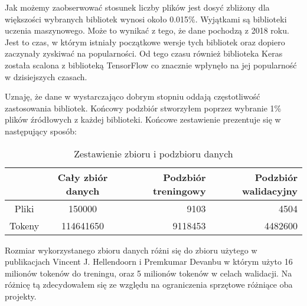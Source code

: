 Jak możemy zaobserwować stosunek liczby plików jest dosyć zbliżony dla większości wybranych bibliotek wynosi około 0.015\%. Wyjątkami są 
biblioteki uczenia maszynowego. Może to wynikać z tego, że dane pochodzą z 2018 roku. Jest to czas, w którym istniały początkowe wersje tych bibliotek oraz dopiero
zaczynały zyskiwać na popularności. Od tego czasu również biblioteka Keras została scalona z biblioteką TensorFlow co znacznie wpłynęło na jej popularność w dzisiejszych czasach. 

Uznaję, że dane w wystarczająco dobrym stopniu oddają częstotliwość zastosowania bibliotek. Końcowy podzbiór stworzyłem poprzez wybranie 1\% plików źródłowych z każdej biblioteki. 
Końcowe zestawienie prezentuje się w następujący sposób:

\begin{table}[!h] \centering
    \caption{Zestawienie zbioru i podzbioru danych}
    \label{tab:dataset-compare-github}
    
    \begin{tabular} {| c | c | r | r |} \hline
         & Cały zbiór danych & Podzbiór treningowy & Podzbiór walidacyjny \\\hline\hline
        Pliki & 150000 & 9103 & 4504 \\\hline
        Tokeny & 114641650 & 9118453 & 4482600 \\ \hline
    \end{tabular}
\end{table}
Rozmiar wykorzystanego zbioru danych różni się do zbioru użytego w publikacjach Vincent J. Hellendoorn i Premkumar Devanbu \cite{hellendoorn} w którym użyto 16 milionów tokenów do treningu, oraz 
5 milionów tokenów w celach walidacji. Na różnicę tą zdecydowałem się ze względu na ograniczenia sprzętowe różniące oba projekty. 


